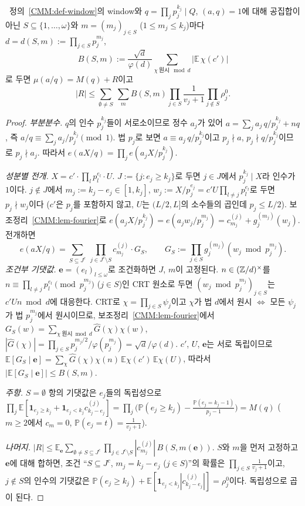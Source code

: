 \begin{proposition}[정확 전개]\label{CMM:prop-exact}
\PROVED\ 정의~\ref{CMM:def-window}의 window와 $q=\prod_j p_j^{k_j}\mid Q$, $(a,q)=1$에 대해
공집합이 아닌 $S\subseteq\{1,\dots,\omega\}$와 $m=(m_j)_{j\in S}$ ($1\le m_j\le k_j$)마다 $d=d(S,m):=\prod_{j\in S}p_j^{m_j}$,
\[
B(S,m):=\frac{\sqrt d}{\varphi(d)}\sum_{\chi\ \text{원시}\ \bmod d}\bigl|\mathbb E\,\chi(c')\bigr|
\]
로 두면 $\mu(a/q)=M(q)+R$이고
\[
|R|\le\sum_{\emptyset\ne S}\ \sum_{m}B(S,m)\prod_{j\in S}\frac1{v_j+1}\prod_{j\notin S}\rho^0_j .
\]
\end{proposition}
\begin{proof}
\emph{부분분수.} $q$의 인수 $p_j^{k_j}$들이 서로소이므로 정수 $a_j$가 있어 $a=\sum_j a_j\,q/p_j^{k_j}+nq$, 즉
$a/q\equiv\sum_j a_j/p_j^{k_j}\pmod 1$. 법 $p_j$로 보면 $a\equiv a_j\,q/p_j^{k_j}$이고 $p_j\nmid a$, $p_j\nmid q/p_j^{k_j}$이므로 $p_j\nmid a_j$.
따라서 $e(aX/q)=\prod_j e(a_jX/p_j^{k_j})$.

\emph{성분별 전개.} $X=c'\cdot\prod_l p_l^{e_l}\cdot U$. $J:=\{j:e_j\ge k_j\}$로 두면 $j\in J$에서 $p_j^{k_j}\mid X$라 인수가 $1$이다.
$j\notin J$에서 $m_j:=k_j-e_j\in[1,k_j]$, $w_j:=X/p_j^{e_j}=c'U\prod_{l\ne j}p_l^{e_l}$로 두면 $p_j\nmid w_j$이다
($c'$은 $p_j$를 포함하지 않고, $U$는 $(L/2,L]$의 소수들의 곱인데 $p_j\le L/2$). 보조정리~\ref{CMM:lem-fourier}로
$e(a_jX/p_j^{k_j})=e(a_jw_j/p_j^{m_j})=c^{(j)}_{m_j}+g_j^{(m_j)}(w_j)$. 전개하면
\[
e(aX/q)=\sum_{S\subseteq J^c}\ \prod_{j\in J^c\setminus S}c^{(j)}_{m_j}\cdot G_S,\qquad G_S:=\prod_{j\in S}g^{(m_j)}_j(w_j\bmod p_j^{m_j}).
\]
\emph{조건부 기댓값.} $\mathbf e=(e_l)_{l\le\omega}$로 조건화하면 $J$, $m$이 고정된다. $n\in(\mathbb{Z}/d)^\times$를
$n\equiv\prod_{l\ne j}p_l^{e_l}\pmod{p_j^{m_j}}$ ($j\in S$)인 CRT 원소로 두면 $(w_j\bmod p_j^{m_j})_{j\in S}$는 $c'Un\bmod d$에 대응한다.
CRT로 $\chi=\prod_{j\in S}\psi_j$이고 $\chi$가 법 $d$에서 원시 $\iff$ 모든 $\psi_j$가 법 $p_j^{m_j}$에서 원시이므로,
보조정리~\ref{CMM:lem-fourier}에서 $G_S(w)=\sum_{\chi\ \text{원시}\bmod d}\hat G(\chi)\chi(w)$, $|\hat G(\chi)|=\prod_{j\in S}p_j^{m_j/2}/\varphi(p_j^{m_j})=\sqrt d/\varphi(d)$.
$c'$, $U$, $\mathbf e$는 서로 독립이므로
$\mathbb E[G_S\mid\mathbf e]=\sum_\chi\hat G(\chi)\chi(n)\,\mathbb E\chi(c')\,\mathbb E\chi(U)$, 따라서 $|\mathbb E[G_S\mid\mathbf e]|\le B(S,m)$.

\emph{주항.} $S=\emptyset$ 항의 기댓값은 $e_j$들의 독립성으로
$\prod_j\mathbb E[\mathbf 1_{e_j\ge k_j}+\mathbf 1_{e_j<k_j}c^{(j)}_{k_j-e_j}]=\prod_j\bigl(\mathbb P(e_j\ge k_j)-\frac{\mathbb P(e_j=k_j-1)}{p_j-1}\bigr)=M(q)$
($m\ge2$에서 $c_m=0$, $\mathbb P(e_j=t)=\frac1{v_j+1}$).

\emph{나머지.} $|R|\le\mathbb E_{\mathbf e}\sum_{\emptyset\ne S\subseteq J^c}\prod_{j\in J^c\setminus S}|c^{(j)}_{m_j}|\,B(S,m(\mathbf e))$.
$S$와 $m$을 먼저 고정하고 $\mathbf e$에 대해 합하면, 조건 ``$S\subseteq J^c$, $m_j=k_j-e_j$ ($j\in S$)''의 확률은 $\prod_{j\in S}\frac1{v_j+1}$이고,
$j\notin S$의 인수의 기댓값은 $\mathbb P(e_j\ge k_j)+\mathbb E[\mathbf 1_{e_j<k_j}|c^{(j)}_{k_j-e_j}|]=\rho^0_j$이다. 독립성으로 곱이 된다.
\end{proof}

